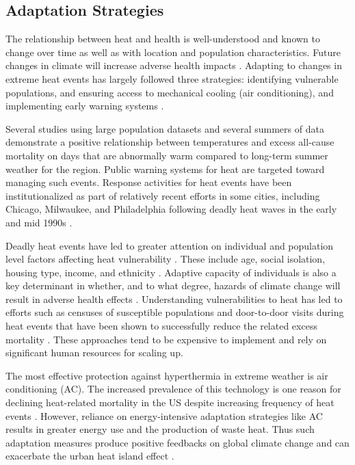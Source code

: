 \documentclass{ametsoc}
\begin{document}
\subsection{Adaptation Strategies} \label{subsec:adaptationStrategies}
The relationship between heat and health is well-understood and known to change over time as well as with location and population characteristics.  Future changes in climate will increase adverse health impacts \citep{Patz2005, Luber2008}. Adapting to changes in extreme heat events has largely followed three strategies: identifying vulnerable populations, and ensuring access to mechanical cooling (air conditioning), and implementing early warning systems \citep{EPA, Oneill}. 

Several studies using large population datasets and several summers of data demonstrate a positive relationship between temperatures and excess all-cause mortality \citep{Medina2007, Basu2002, Curriero2002} on days that are abnormally warm compared to long-term summer weather for the region. Public warning systems for heat are targeted toward managing such events. Response activities for heat events have been institutionalized as part of relatively recent efforts in some cities,  including Chicago, Milwaukee, and Philadelphia following deadly heat waves in the early and mid 1990s \citep{Ebi2004,Weisskopf2002}. 

Deadly heat events have led to greater attention on individual and population level factors affecting heat vulnerability \citep{Palecki2001}. These include age, social isolation, housing type, income, and ethnicity \citep{Browning2006,Naughton2002}. Adaptive capacity of individuals is also a key determinant in whether, and to what degree, hazards of climate change will result in adverse health effects \citep{Wilhelmi2010}. Understanding vulnerabilities to heat has led to efforts such as censuses of susceptible populations and door-to-door visits during heat events that have been shown to successfully reduce the related excess mortality \citep{Li2012, Weisskopf2002}. These approaches tend to be expensive to implement and rely on significant human resources for scaling up. 

The most effective protection against hyperthermia in extreme weather is air conditioning (AC). The increased prevalence of this technology is one reason for declining heat-related mortality in the US despite increasing frequency of heat events \citep{Davis2003}. However, reliance on energy-intensive adaptation strategies like AC results in greater energy use and the production of waste heat. Thus such adaptation measures produce positive feedbacks on global climate change and can exacerbate the urban heat island effect \citep{Salamanca2014}. 
\end{document}
